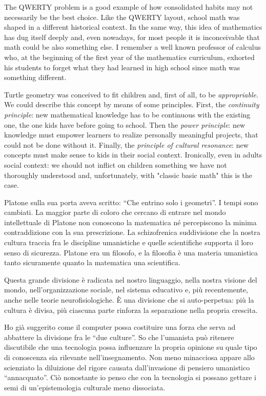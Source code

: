 The QWERTY problem is a good example of how consolidated habits may not necessarily be the best choice. Like the QWERTY layout, school math was shaped in a different historical context. In the same way, this idea of mathematics has dug itself deeply and, even nowadays, for most people it is inconceivable that math could be also something else. I remember a well known professor of calculus who, at the beginning of the first year of the mathematics curriculum, exhorted his students to forget what they had learned in high school since math was something different. 

Turtle geometry was conceived to fit children and, first of all, to be \textit{appropriable}. We could describe this concept by means of some principles. First, the \textit{continuity principle}: new mathematical knowledge has to be continuous with the existing one, the one kids have before going to school. Then the \textit{power principle}: new knowledge must empower learners to realize personally meaningful projects, that could not be done without it. Finally, the \textit{principle of cultural resonance}: new concepts must make sense to kids in their social context. Ironically, even in adults social context: we should not inflict on children something we have not thoroughly understood and, unfortunately, with "classic basic math" this is the case. 


Platone sulla sua porta aveva scritto: “Che entrino solo i geometri”. I tempi sono cambiati. La maggior parte di coloro che cercano di entrare nel mondo intellettuale di Platone non conoscono la matematica né percepiscono la minima contraddizione con la sua prescrizione. La schizofrenica suddivisione che la nostra cultura traccia fra le discipline umanistiche e quelle scientifiche supporta il loro senso di sicurezza. Platone era un filosofo, e la filosofia è una materia umanistica tanto sicuramente quanto la matematica una scientifica.

Questa grande divisione è radicata nel nostro linguaggio, nella nostra visione del mondo, nell'organizzazione sociale, nel sistema educativo e, più recentemente, anche nelle teorie neurofisiologiche. È una divisione che si auto-perpetua: più la cultura è divisa, più ciascuna parte rinforza la separazione nella propria crescita.

Ho già suggerito come il computer possa costituire una forza che serva ad abbattere la divisione fra le “due culture”. So che l'umanista può ritenere discutibile che una tecnologia possa influenzare la propria opinione su quale tipo di conoscenza sia rilevante nell'insegnamento. Non meno minacciosa appare allo scienziato la diluizione del rigore causata dall'invasione di pensiero umanistico “annacquato”. Ciò nonostante io penso che con la tecnologia si possano gettare i semi di un'epistemologia culturale meno dissociata.

